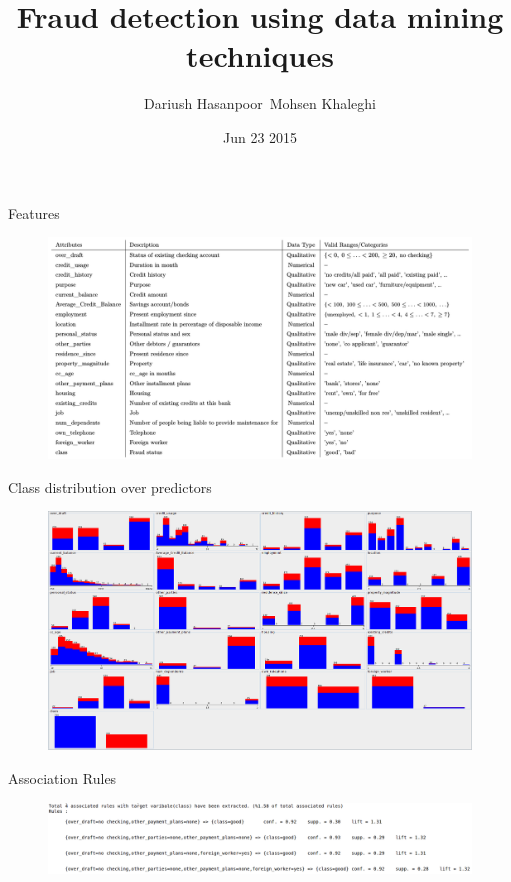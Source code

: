 \documentclass[]{beamer}
\title[]{Fraud detection using data mining techniques}
\author[]{Dariush Hasanpoor\, Mohsen Khaleghi}
\institute[]{Isfahan University Of Technology}
\date[]{Jun 23 2015}
\renewcommand{\|}[1][.3em]{\hspace{#1}|\hspace{#1}}
\renewcommand{\,}[1][.3em]{,\hspace{#1}}
\begin{document}
\begin{frame}
  \titlepage
\end{frame}

\begin{frame}{Features}
\begin{figure}
\centering
\includegraphics[width=\textwidth]{features}
\end{figure}
\end{frame}

\begin{frame}{Class distribution over predictors}
\begin{figure}
\centering
\includegraphics[width=\textwidth]{overall_dist}
\end{figure}
\end{frame}

\begin{frame}{Association Rules}
\begin{figure}
\centering
\includegraphics[width=\textwidth]{assoc}
\end{figure}
\end{frame}
\end{document}
